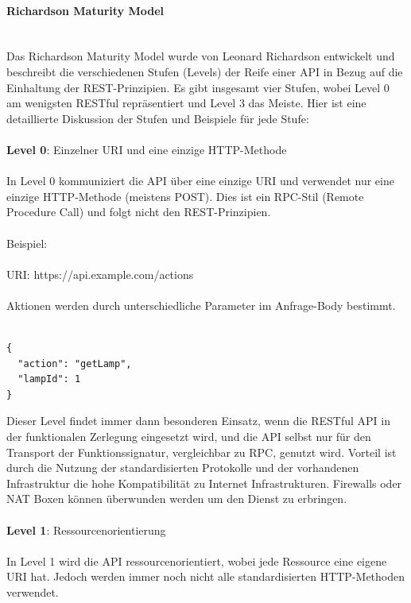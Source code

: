 \paragraph{Richardson Maturity Model\\\\}
Das Richardson Maturity Model wurde von Leonard Richardson entwickelt und beschreibt die verschiedenen Stufen (Levels) der Reife einer API in Bezug auf die Einhaltung der REST-Prinzipien. Es gibt insgesamt vier Stufen, wobei Level 0 am wenigsten RESTful repräsentiert und Level 3 das Meiste. Hier ist eine detaillierte Diskussion der Stufen und Beispiele für jede Stufe:
\\\\
\textbf{Level 0}: Einzelner URI und eine einzige HTTP-Methode
\\\\
In Level 0 kommuniziert die API über eine einzige URI und verwendet nur eine einzige HTTP-Methode (meistens POST). Dies ist ein RPC-Stil (Remote Procedure Call) und folgt nicht den REST-Prinzipien.
\\\\
Beispiel:
\\\\
URI: https://api.example.com/actions
\\\\
Aktionen werden durch unterschiedliche Parameter im Anfrage-Body bestimmt.\\\\
\noindent\begin{minipage}{\textwidth}
\begin{lstlisting}[caption={Level 0},captionpos=b,label={lst:level_0}]
{
  "action": "getLamp",
  "lampId": 1
}
\end{lstlisting}
\end{minipage}
Dieser Level findet immer dann besonderen Einsatz, wenn die RESTful API in der funktionalen Zerlegung eingesetzt wird, und die API selbst nur für den Transport der Funktionssignatur, vergleichbar zu RPC, genutzt wird. Vorteil ist durch die Nutzung der standardisierten Protokolle und der vorhandenen Infrastruktur die hohe Kompatibilität zu Internet Infrastrukturen. Firewalls oder NAT Boxen können überwunden werden um den Dienst zu erbringen. 
\\\\
\textbf{Level 1}: Ressourcenorientierung
\\\\
In Level 1 wird die API ressourcenorientiert, wobei jede Ressource eine eigene URI hat. Jedoch werden immer noch nicht alle standardisierten HTTP-Methoden verwendet.
